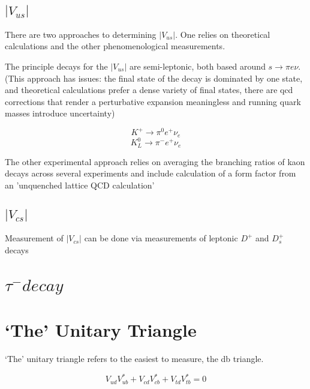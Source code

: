 \documentclass[]{article}
\begin{document}
	\subsection{$|V_{us}|$}
	
	There are two approaches to determining $|V_{us}|$. One relies on theoretical calculations and the other phenomenological measurements.
	
	The principle decays for the $|V_{us}|$ are semi-leptonic, both based around $s\rightarrow\pi e\nu$. (This approach has issues: the final state of the decay is dominated by one state, and theoretical calculations prefer a dense variety of final states, there are qcd corrections that render a perturbative expansion meaningless and running quark masses introduce uncertainty)
		
		\begin{equation*}
			K^+ \rightarrow \pi^0e^+\nu_e
		\end{equation*}
		\begin{equation*}
			K^0_L \rightarrow \pi^-e^+\nu_e
		\end{equation*}
		
	The other experimental approach relies on averaging the branching ratios of kaon decays across several experiments and include calculation of a form factor from an 'unquenched lattice QCD calculation'
	
	\subsection{$|V_{cs}|$}
	
	Measurement of $|V_{cs}|$ can be done via measurements of leptonic $D^+$ and $D^+_s$ decays
	
	\newpage
	
\section{$\tau^- decay$}
	 
\section{`The' Unitary Triangle}

	`The' unitary triangle refers to the easiest to measure, the db triangle.
	
	\begin{equation*}
	V_{ud}V^*_{ub} + V_{cd}V^*_{cb} + V_{td}V^*_{tb} = 0
	\end{equation*}
\end{document}

